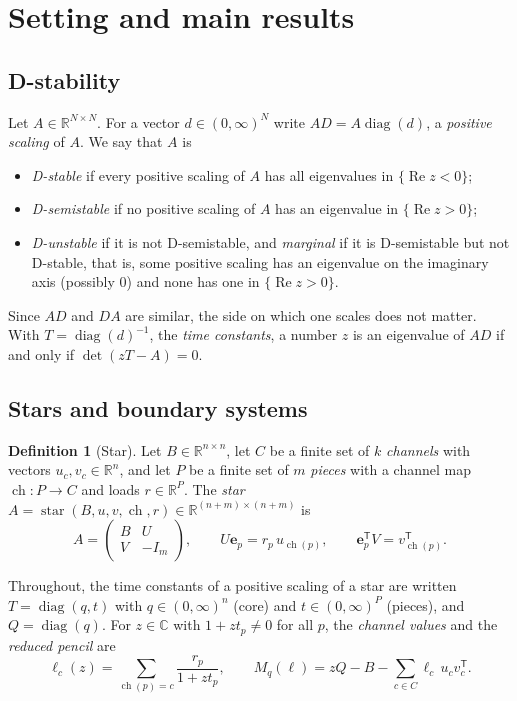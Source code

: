 \documentclass[11pt,a4paper]{article}
\theoremstyle{plain}
\theoremstyle{definition}
\newtheorem{definition}[theorem]{Definition}
\theoremstyle{remark}
\newcommand{\R}{\mathbb{R}}
\newcommand{\C}{\mathbb{C}}
\newcommand{\Real}{\operatorname{Re}}
\newcommand{\diag}{\operatorname{diag}}
\newcommand{\ch}{\operatorname{ch}}
\newcommand{\be}{\mathbf{e}}
\newcommand{\T}{\mathsf{T}}
\begin{document}
\section{Setting and main results}\label{sec:setting}

\subsection{D-stability}

Let $A\in\R^{N\times N}$. For a vector $d\in(0,\infty)^N$ write $AD=A\diag(d)$, a
\emph{positive scaling} of $A$. We say that $A$ is
\begin{itemize}
  \item \emph{D-stable} if every positive scaling of $A$ has all eigenvalues in
    $\{\Real z<0\}$;
  \item \emph{D-semistable} if no positive scaling of $A$ has an eigenvalue in
    $\{\Real z>0\}$;
  \item \emph{D-unstable} if it is not D-semistable, and \emph{marginal} if it is
    D-semistable but not D-stable, that is, some positive scaling has an eigenvalue on the
    imaginary axis (possibly $0$) and none has one in $\{\Real z>0\}$.
\end{itemize}
Since $AD$ and $DA$ are similar, the side on which one scales does not matter. With
$T=\diag(d)^{-1}$, the \emph{time constants}, a number $z$ is an eigenvalue of $AD$ if and
only if $\det(zT-A)=0$.

\subsection{Stars and boundary systems}

\begin{definition}[Star]\label{def:star}
Let $B\in\R^{n\times n}$, let $C$ be a finite set of $k$ \emph{channels} with vectors
$u_c,v_c\in\R^n$, and let $P$ be a finite set of $m$ \emph{pieces} with a channel map
$\ch\colon P\to C$ and loads $r\in\R^P$. The \emph{star}
$A=\operatorname{star}(B,u,v,\ch,r)\in\R^{(n+m)\times(n+m)}$ is
\[
  A=\begin{pmatrix} B & U\\ V & -I_m\end{pmatrix},
  \qquad U\be_p=r_p\,u_{\ch(p)},\qquad \be_p^\T V=v_{\ch(p)}^\T .
\]
\end{definition}

Throughout, the time constants of a positive scaling of a star are written
$T=\diag(q,t)$ with $q\in(0,\infty)^n$ (core) and $t\in(0,\infty)^P$ (pieces), and
$Q=\diag(q)$. For $z\in\C$ with $1+zt_p\ne0$ for all $p$, the \emph{channel values} and
the \emph{reduced pencil} are
\begin{equation}\label{eq:pencil}
  \ell_c(z)=\sum_{\ch(p)=c}\frac{r_p}{1+zt_p},\qquad
  M_q(\ell)=zQ-B-\sum_{c\in C}\ell_c\,u_cv_c^\T .
\end{equation}
\end{document}
